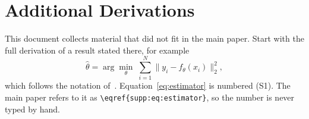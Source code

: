 \section{Additional Derivations}
\label{sec:derivations}

This document collects material that did not fit in the main paper. Start with the full derivation of a result stated there, for example
\begin{equation}
  \hat{\theta} = \arg\min_{\theta}\; \sum_{i=1}^{N} \bigl\| y_i - f_\theta(x_i) \bigr\|_2^2 ,
  \label{eq:estimator}
\end{equation}
which follows the notation of~\cite{shell2015ieeetran}. Equation~\eqref{eq:estimator} is numbered (S1). The main paper refers to it as \verb|\eqref{supp:eq:estimator}|, so the number is never typed by hand.
